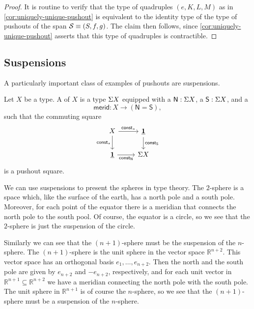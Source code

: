 \begin{proof}
  It is routine to verify that the type of quadruples $(e,K,L,M)$ as in \cref{cor:uniquely-unique-pushout} is equivalent to the identity type of the type of pushouts of the span $\mathcal{S}\equiv (S,f,g)$. The claim then follows, since \cref{cor:uniquely-unique-pushout} asserts that this type of quadruples is contractible. 
\end{proof}

\subsection{Suspensions}
A particularly important class of examples of pushouts are suspensions.

\begin{defn}
  Let $X$ be a type. A  of $X$ is a type $\Sigma X$ equipped with a  $\mathsf{N}:\Sigma X$, a  $\mathsf{S}:\Sigma X$, and a 
  \begin{equation*}
    \mathsf{merid} : X \to (\mathsf{N}=\mathsf{S}),
  \end{equation*}
  such that the commuting square
  \begin{equation*}
    \begin{tikzcd}
      X \arrow[r,"\mathsf{const}_\ttt"] \arrow[d,swap,"\mathsf{const}_\ttt"] & \unit \arrow[d,"{\mathsf{const}_\south}"] \\
      \unit \arrow[r,swap,"\mathsf{const}_\north"] & \susp X
    \end{tikzcd}
  \end{equation*}
  is a pushout square.
\end{defn}

We can use suspensions to present the spheres in type theory. The $2$-sphere is a space which, like the surface of the earth, has a north pole and a south pole. Moreover, for each point of the equator there is a meridian that connects the north pole to the south pool. Of course, the equator is a circle, so we see that the $2$-sphere is just the suspension of the circle.

Similarly we can see that the $(n+1)$-sphere must be the suspension of the $n$-sphere. The $(n+1)$-sphere is the unit sphere in the vector space $\mathbb{R}^{n+2}$. This vector space has an orthogonal basis $e_1,\ldots,e_{n+2}$. Then the north and the south pole are given by $e_{n+2}$ and $-e_{n+2}$, respectively, and for each unit vector in $\mathbb{R}^{n+1}\subseteq\mathbb{R}^{n+2}$ we have a meridian connecting the north pole with the south pole. The unit sphere in $\mathbb{R}^{n+1}$ is of course the $n$-sphere, so we see that the $(n+1)$-sphere must be a suspension of the $n$-sphere.

